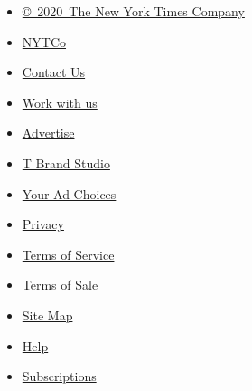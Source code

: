 \begin{itemize}
\tightlist
\item
  \href{https://help.nytimes.com/hc/en-us/articles/115014792127-Copyright-notice}{©~2020~The
  New York Times Company}
\end{itemize}

\begin{itemize}
\tightlist
\item
  \href{https://www.nytco.com/}{NYTCo}
\item
  \href{https://help.nytimes.com/hc/en-us/articles/115015385887-Contact-Us}{Contact
  Us}
\item
  \href{https://www.nytco.com/careers/}{Work with us}
\item
  \href{https://nytmediakit.com/}{Advertise}
\item
  \href{http://www.tbrandstudio.com/}{T Brand Studio}
\item
  \href{https://www.nytimes.com/privacy/cookie-policy\#how-do-i-manage-trackers}{Your
  Ad Choices}
\item
  \href{https://www.nytimes.com/privacy}{Privacy}
\item
  \href{https://help.nytimes.com/hc/en-us/articles/115014893428-Terms-of-service}{Terms
  of Service}
\item
  \href{https://help.nytimes.com/hc/en-us/articles/115014893968-Terms-of-sale}{Terms
  of Sale}
\item
  \href{https://spiderbites.nytimes.com}{Site Map}
\item
  \href{https://help.nytimes.com/hc/en-us}{Help}
\item
  \href{https://www.nytimes.com/subscription?campaignId=37WXW}{Subscriptions}
\end{itemize}
